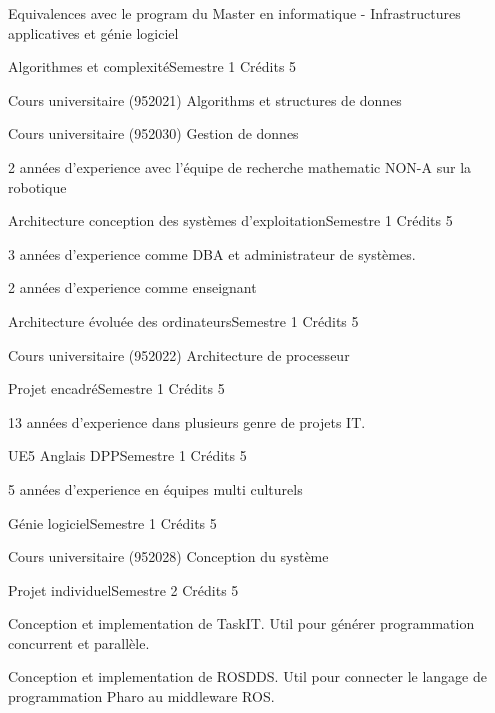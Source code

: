 \documentclass{resume} %
\begin{document}
\begin{rSection}{Equivalences avec le program du Master en informatique - Infrastructures applicatives et génie logiciel}


	\begin{rSubsection}{Algorithmes et complexité}{Semestre 1}{ Crédits 5 }
		\item Cours universitaire (952021) Algorithms et structures de donnes
		\item Cours universitaire (952030) Gestion de donnes
		\item 2 années d'experience avec l'équipe de recherche mathematic NON-A sur la robotique 
	\end{rSubsection}
	\begin{rSubsection}{Architecture conception des systèmes d'exploitation}{Semestre 1}{ Crédits 5 }
		\item 3 années d'experience comme DBA et administrateur de systèmes.
		\item 2 années d'experience comme enseignant 
	\end{rSubsection}
	\begin{rSubsection}{Architecture évoluée des ordinateurs}{Semestre 1}{ Crédits 5 }
		\item Cours universitaire (952022) Architecture de processeur 
	\end{rSubsection}
	\begin{rSubsection}{Projet encadré}{Semestre 1}{ Crédits 5 }
		\item 13 années d'experience dans plusieurs genre de projets IT.
	\end{rSubsection}
	\begin{rSubsection}{UE5 Anglais  DPP}{Semestre 1}{ Crédits 5 }
		\item 5 années d’experience en équipes multi culturels
	\end{rSubsection}	
	\begin{rSubsection}{Génie logiciel}{Semestre 1}{ Crédits 5 }
		\item Cours universitaire (952028) Conception du système 
	\end{rSubsection}
	\begin{rSubsection}{Projet individuel}{Semestre 2}{ Crédits 5 }
		\item Conception et implementation de TaskIT. Util pour générer programmation concurrent et parallèle. 
		\item Conception et implementation de ROSDDS. Util pour connecter le langage de programmation Pharo au middleware ROS. 

\end{rSubsection}
\end{rSection}
\end{document}
